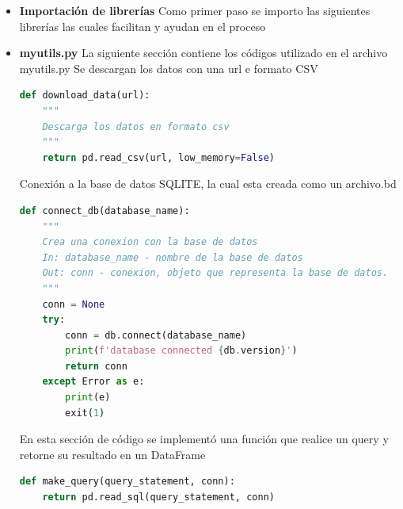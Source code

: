 \documentclass[conference,compsoc,onecolumn]{IEEEtran}
\begin{document}
 \begin{itemize}
    \item \textbf{Importación de librerías}
    \singlespacing 
    Como primer paso se importo las siguientes librerías las cuales facilitan y ayudan en el proceso
    
    \singlespacing
    
    \item \textbf{myutils.py}
    La siguiente sección contiene los códigos utilizado en el archivo myutils.py
    \singlespacing 
    Se descargan los datos con una url e formato CSV
    
    \begin{lstlisting}[language=python, caption=Descarga de datos en formato CSV, captionpos=b, label=lst:SNRCode]
def download_data(url):
    """
    Descarga los datos en formato csv
    """
    return pd.read_csv(url, low_memory=False)
      \end{lstlisting}
    \singlespacing
   
Conexión a la base de datos SQLITE, la cual esta creada como un archivo.bd
        \begin{lstlisting}[language=python, caption=Creación de conexión a la base de datos, captionpos=b, label=lst:SNRCode]
def connect_db(database_name):
    """
    Crea una conexion con la base de datos
    In: database_name - nombre de la base de datos
    Out: conn - conexion, objeto que representa la base de datos.
    """
    conn = None
    try:
        conn = db.connect(database_name)
        print(f'database connected {db.version}')
        return conn
    except Error as e:
        print(e)
        exit(1)
      \end{lstlisting}
    \singlespacing

En esta sección de código se implementó una función que realice un query y retorne su resultado en un DataFrame 
        \begin{lstlisting}[language=python, caption=Funcion del desarrollo de querys, captionpos=b, label=lst:SNRCode]
def make_query(query_statement, conn):
    return pd.read_sql(query_statement, conn)


\end{lstlisting}
\end{itemize}
\end{document}

